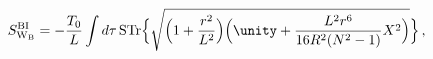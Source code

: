\begin{equation}
S^{\rm BI}_{\rm W_B}=-\frac{T_0}{L}\int d\tau\, {\rm STr}\Bigl\{\sqrt{\Bigl(1+\frac{r^2}{L^2}\Bigr)
\Bigl(\unity+\frac{L^2 r^6}{16R^2(N^2-1)}X^2\Bigr)}\Bigr\}\, ,
\end{equation}

